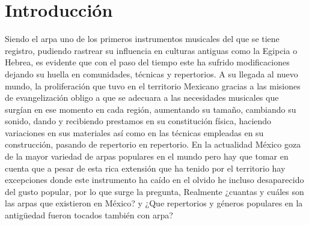 \section{Introducción}
Siendo el arpa uno de los primeros instrumentos musicales del que se tiene registro, pudiendo rastrear su influencia en culturas antiguas como la Egipcia o Hebrea, es evidente que con el paso del tiempo este ha sufrido modificaciones dejando su huella en comunidades, técnicas y repertorios. A su llegada al nuevo mundo, la proliferación que tuvo en el territorio Mexicano gracias a las misiones de evangelización obligo a que se adecuara a las necesidades musicales que surgían en ese momento en cada región, aumentando su tamaño, cambiando su sonido, dando y recibiendo prestamos en su constitución física, haciendo variaciones en sus materiales así como en las técnicas empleadas en su construcción, pasando de repertorio en repertorio. En la actualidad México goza de la mayor variedad de arpas populares en el mundo pero hay que tomar en cuenta que a pesar de esta rica extensión que ha tenido por el territorio hay excepciones donde este instrumento ha caído en el olvido he incluso desaparecido del gusto popular, por lo que surge la pregunta, Realmente ¿cuantas y cuáles son las arpas que existieron en México? y ¿Que repertorios y géneros populares en la antigüedad fueron tocados también con arpa?